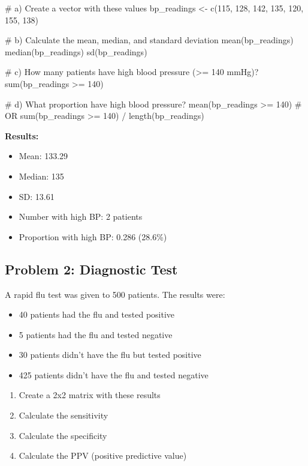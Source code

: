\documentclass[11pt]{article}
\begin{document}
\begin{answerbox}
\begin{rcode}
# a) Create a vector with these values
bp_readings <- c(115, 128, 142, 135, 120, 155, 138)

# b) Calculate the mean, median, and standard deviation
mean(bp_readings)
median(bp_readings)
sd(bp_readings)

# c) How many patients have high blood pressure (>= 140 mmHg)?
sum(bp_readings >= 140)

# d) What proportion have high blood pressure?
mean(bp_readings >= 140)
# OR
sum(bp_readings >= 140) / length(bp_readings)
\end{rcode}

\textbf{Results:}
\begin{itemize}
\item Mean: 133.29
\item Median: 135
\item SD: 13.61
\item Number with high BP: 2 patients
\item Proportion with high BP: 0.286 (28.6\%)
\end{itemize}
\end{answerbox}

\subsection{Problem 2: Diagnostic Test}

A rapid flu test was given to 500 patients. The results were:
\begin{itemize}
\item 40 patients had the flu and tested positive
\item 5 patients had the flu and tested negative
\item 30 patients didn't have the flu but tested positive
\item 425 patients didn't have the flu and tested negative
\end{itemize}

\begin{enumerate}[label=\alph*)]
\item Create a 2x2 matrix with these results
\item Calculate the sensitivity
\item Calculate the specificity
\item Calculate the PPV (positive predictive value)
\end{enumerate}
\end{document}
